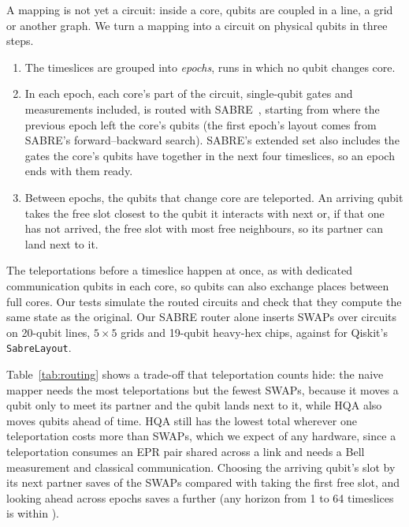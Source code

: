 \documentclass[11pt]{article}
\begin{document}
A mapping is not yet a circuit: inside a core, qubits are coupled in a line,
a grid or another graph. We turn a mapping into a circuit on physical qubits
in three steps.
\begin{enumerate}
\item The timeslices are grouped into \emph{epochs}, runs in which no qubit
  changes core.
\item In each epoch, each core's part of the circuit, single-qubit gates and
  measurements included, is routed with SABRE~\cite{li2019sabre}, starting
  from where the previous epoch left the core's qubits (the first epoch's
  layout comes from SABRE's forward--backward search). SABRE's extended set
  also includes the gates the core's qubits have together in the next four
  timeslices, so an epoch ends with them ready.
\item Between epochs, the qubits that change core are teleported. An
  arriving qubit takes the free slot closest to the qubit it interacts with
  next or, if that one has not arrived, the free slot with most free
  neighbours, so its partner can land next to it.
\end{enumerate}
The teleportations before a timeslice happen at once, as with dedicated
communication qubits in each core, so qubits can also exchange places between
full cores. Our tests simulate the routed circuits and check that they
compute the same state as the original. Our SABRE router alone inserts
\sabreOurs{} SWAPs over \sabreCircuits{} circuits on 20-qubit lines, $5\times5$
grids and 19-qubit heavy-hex chips, against \sabreQiskit{} for Qiskit's
\texttt{SabreLayout}.

\begin{table}[t]
\centering

\caption{Totals over the five 100-qubit benchmarks on 10 cores of 10 qubits
linked all to all, with the qubits of each core coupled in a $2\times5$ grid
or a line.}
\label{tab:routing}
\end{table}

Table~\ref{tab:routing} shows a trade-off that teleportation counts hide: the
naive mapper needs the most teleportations but the fewest SWAPs, because it
moves a qubit only to meet its partner and the qubit lands next to it, while
HQA also moves qubits ahead of time. HQA still has the lowest total wherever
one teleportation costs more than \breakEven{} SWAPs, which we expect of
any hardware, since a teleportation consumes an EPR pair shared across a link
and needs a Bell measurement and classical communication. Choosing the arriving qubit's slot by its next partner
saves \slotSaving{} of the SWAPs compared with taking the first free slot, and
looking ahead across epochs saves a further \lookAheadSaving{} (any horizon
from 1 to 64 timeslices is within \horizonSpread{}).
\end{document}
